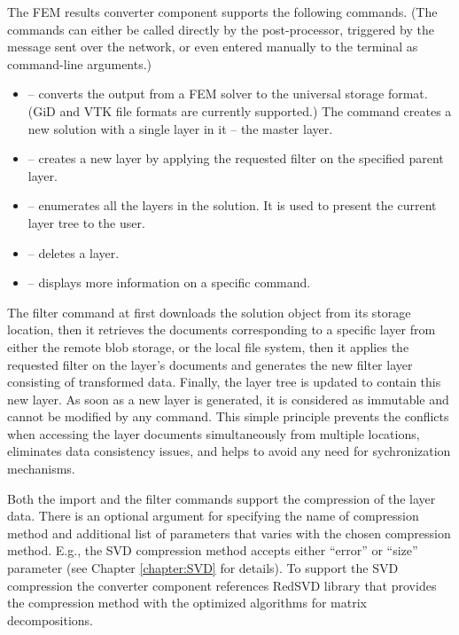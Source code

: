 The FEM results converter component supports the following commands. (The commands can either be called directly by the post-processor, triggered by the message sent over the network, or even entered manually to the terminal as command-line arguments.)

\begin{itemize}
    \item {} -- converts the output from a FEM solver to the universal storage format. (GiD and VTK file formats are currently supported.) The command creates a new solution with a single layer in it -- the master layer.
    \item {} -- creates a new layer by applying the requested filter on the specified parent layer.
    \item {} -- enumerates all the layers in the solution. It is used to present the current layer tree to the user.
    \item {} -- deletes a layer.
    \item {} -- displays more information on a specific command.
\end{itemize}

The filter command at first downloads the solution object from its storage location, then it retrieves the documents corresponding to a specific layer from either the remote blob storage, or the local file system, then it applies the requested filter on the layer's documents and generates the new filter layer consisting of transformed data. Finally, the layer tree is updated to contain this new layer. As soon as a new layer is generated, it is considered as immutable and cannot be modified by any command. This simple principle prevents the conflicts when accessing the layer documents simultaneously from multiple locations, eliminates data consistency issues, and helps to avoid any need for sychronization mechanisms.

Both the import and the filter commands support the compression of the layer data. There is an optional argument for specifying the name of compression method and additional list of parameters that varies with the chosen compression method. E.g., the SVD compression method accepts either ``error'' or ``size'' parameter (see Chapter \ref{chapter:SVD} for details). To support the SVD compression the converter component references RedSVD library \cite{RedSVD} that provides the compression method with the optimized algorithms for matrix decompositions.

